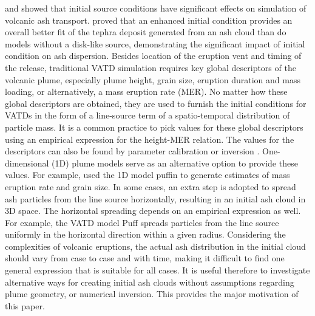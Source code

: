 \documentclass[utf8]{frontiersSCNS} %
\begin{document}
\citet{fero2009simulating} and \citet{stohl2011determination} showed that initial source conditions have significant effects on simulation of volcanic ash transport. \citet{constantinescu2021radius} proved that an enhanced initial condition provides an overall better fit of the tephra deposit generated from an ash cloud than do models without a disk-like source, demonstrating the significant impact of initial condition on ash dispersion. Besides  location of the eruption vent and timing of the release, traditional VATD simulation requires key global descriptors of the volcanic plume, especially plume height, grain size, eruption duration and mass loading, or alternatively, a mass eruption rate (MER). No matter how these global descriptors are obtained, they are used to furnish the initial conditions for VATDs in the form of a line-source term of a spatio-temporal distribution of particle mass. It is a common practice to pick values for these global descriptors using an empirical expression for the height-MER relation. The values for the descriptors can also be found by parameter calibration or inversion \citep[e.g.][]{fero2008simulation,fero2009simulating, stohl2011determination, zidikheri2017estimation}. One-dimensional (1D) plume models serve as an alternative option to provide these values. For example, \citet{bursik2012estimation} used the 1D model puffin \citep{bursik2001effect} to generate estimates of mass eruption rate and grain size. In some cases, an extra step is adopted to spread ash particles from the line source horizontally, resulting in an initial ash cloud in 3D space. The horizontal spreading depends on an empirical expression as well. For example, the VATD model Puff spreads particles from the line source uniformly in the horizontal direction within a given radius. Considering the complexities of volcanic eruptions, the actual ash distribution in the initial cloud should vary from case to case and with time, making it difficult to find one general expression that is suitable for all cases. It is useful therefore to investigate alternative ways for creating initial ash clouds without assumptions regarding plume geometry, or numerical inversion. This provides the major motivation of this paper.
\end{document}

